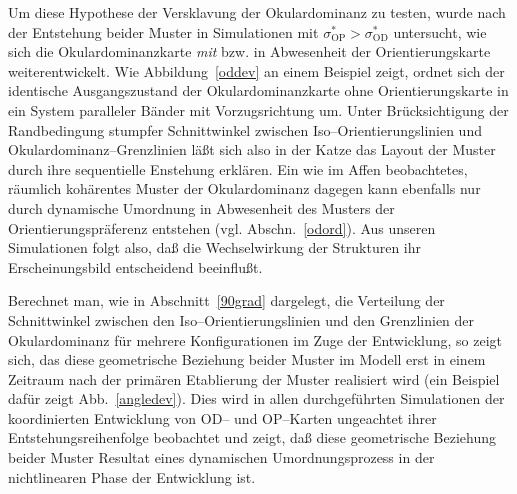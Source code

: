 Um diese Hypothese der Versklavung der Okulardominanz zu testen, wurde nach
der Entstehung beider Muster in Simulationen mit
$\sigma^\ast_{\text{OP}}>\sigma^\ast_{\text{OD}}$ untersucht, wie sich die
Okulardominanzkarte \emph{mit} bzw. in Abwesenheit der Orientierungskarte
weiterentwickelt. Wie Abbildung~\ref{oddev} an einem Beispiel zeigt, ordnet
sich der identische Ausgangszustand der Okulardominanzkarte ohne
Orientierungskarte in ein System paralleler Bänder mit Vorzugsrichtung um.
Unter Brücksichtigung der Randbedingung stumpfer Schnittwinkel zwischen
Iso--Orientierungslinien und Okulardominanz--Grenzlinien läßt sich also
in der Katze das Layout der Muster durch ihre sequentielle Enstehung
erklären.  Ein wie im Affen beobachtetes, räumlich kohärentes Muster der
Okulardominanz dagegen kann ebenfalls nur durch dynamische Umordnung in
Abwesenheit des Musters der Orientierungspräferenz entstehen
(vgl. Abschn.~\ref{odord}).  Aus unseren Simulationen folgt also, daß die
Wechselwirkung der Strukturen ihr Erscheinungsbild entscheidend
beeinflußt.

Berechnet man, wie in Abschnitt~\ref{90grad} dargelegt, die Verteilung der
Schnittwinkel zwischen den Iso--Orientierungslinien und den Grenzlinien der
Okulardominanz für mehrere Konfigurationen im Zuge der Entwicklung, so
zeigt sich, das diese geometrische Beziehung beider Muster im Modell erst
in einem Zeitraum nach der primären Etablierung der Muster realisiert
wird (ein Beispiel dafür zeigt Abb.~\ref{angledev}).  Dies wird in allen
durchgeführten Simulationen der koordinierten Entwicklung von OD-- und
OP--Karten ungeachtet ihrer Entstehungsreihenfolge beobachtet und zeigt,
daß diese geometrische Beziehung beider Muster Resultat eines dynamischen
Umordnungsprozess in der nichtlinearen Phase der Entwicklung ist.
